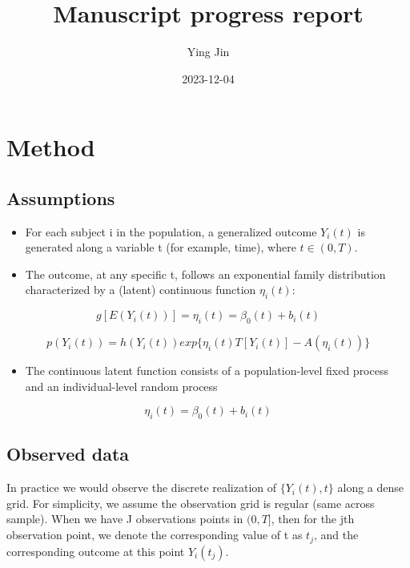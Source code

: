 \documentclass[
]{article}
\title{Manuscript progress report}
\author{Ying Jin}
\date{2023-12-04}
\providecommand{\tightlist}{%
  \setlength{\itemsep}{0pt}\setlength{\parskip}{0pt}}
\begin{document}
\maketitle

{
\setcounter{tocdepth}{3}
\tableofcontents
}
\hypertarget{method}{%
\section{Method}\label{method}}

\hypertarget{assumptions}{%
\subsection{Assumptions}\label{assumptions}}

\begin{itemize}
\tightlist
\item
  For each subject i in the population, a generalized outcome \(Y_i(t)\)
  is generated along a variable t (for example, time), where
  \(t \in (0, T)\).
\item
  The outcome, at any specific t, follows an exponential family
  distribution characterized by a (latent) continuous function
  \(\eta_i(t)\):
\end{itemize}

\[g[E(Y_i(t))] = \eta_i(t) = \beta_0(t)+b_i(t)\]

\[p(Y_i(t)) = h(Y_i(t))exp\{\eta_i(t)T[Y_i(t)]-A(\eta_i(t))\}\]

\begin{itemize}
\tightlist
\item
  The continuous latent function consists of a population-level fixed
  process and an individual-level random process
\end{itemize}

\[\eta_i(t) = \beta_0(t)+b_i(t)\]

\hypertarget{observed-data}{%
\subsection{Observed data}\label{observed-data}}

In practice we would observe the discrete realization of
\(\{Y_i(t), t\}\) along a dense grid. For simplicity, we assume the
observation grid is regular (same across sample). When we have J
observations points in \((0, T]\), then for the jth observation point,
we denote the corresponding value of t as \(t_j\), and the corresponding
outcome at this point \(Y_i(t_j)\).
\end{document}
